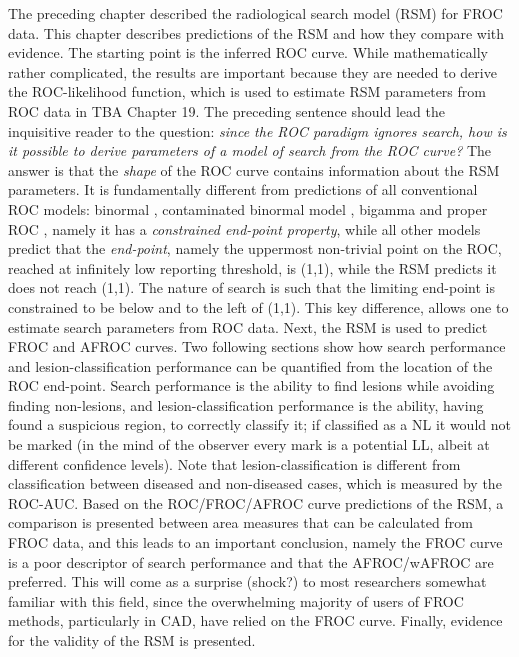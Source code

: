 \documentclass[
]{book}
\begin{document}
The preceding chapter described the radiological search model (RSM) for FROC data. This chapter describes predictions of the RSM and how they compare with evidence. The starting point is the inferred ROC curve. While mathematically rather complicated, the results are important because they are needed to derive the ROC-likelihood function, which is used to estimate RSM parameters from ROC data in TBA Chapter 19. The preceding sentence should lead the inquisitive reader to the question: \emph{since the ROC paradigm ignores search, how is it possible to derive parameters of a model of search from the ROC curve?} The answer is that the \emph{shape} of the ROC curve contains information about the RSM parameters. It is fundamentally different from predictions of all conventional ROC models: binormal \citep{RN1081}, contaminated binormal model \citep{RN1501}, bigamma \citep{RN100} and proper ROC \citep{metz1999proper}, namely it has a \emph{constrained end-point property}, while all other models predict that the \emph{end-point}, namely the uppermost non-trivial point on the ROC, reached at infinitely low reporting threshold, is (1,1), while the RSM predicts it does not reach (1,1). The nature of search is such that the limiting end-point is constrained to be below and to the left of (1,1). This key difference, allows one to estimate search parameters from ROC data. Next, the RSM is used to predict FROC and AFROC curves. Two following sections show how search performance and lesion-classification performance can be quantified from the location of the ROC end-point. Search performance is the ability to find lesions while avoiding finding non-lesions, and lesion-classification performance is the ability, having found a suspicious region, to correctly classify it; if classified as a NL it would not be marked (in the mind of the observer every mark is a potential LL, albeit at different confidence levels). Note that lesion-classification is different from classification between diseased and non-diseased cases, which is measured by the ROC-AUC. Based on the ROC/FROC/AFROC curve predictions of the RSM, a comparison is presented between area measures that can be calculated from FROC data, and this leads to an important conclusion, namely the FROC curve is a poor descriptor of search performance and that the AFROC/wAFROC are preferred. This will come as a surprise (shock?) to most researchers somewhat familiar with this field, since the overwhelming majority of users of FROC methods, particularly in CAD, have relied on the FROC curve. Finally, evidence for the validity of the RSM is presented.
\end{document}

